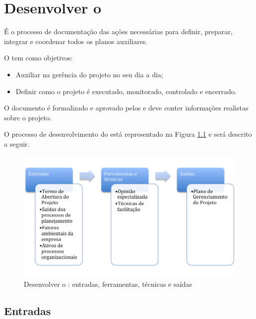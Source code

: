 \chapter{Desenvolver o \planproj}
\label{sec:planproj}

É o processo de documentação das ações necessárias para definir, preparar, integrar e coordenar todos os planos auxiliares.

O \planproj tem como objetivos:

\begin{itemize}
	
	\item Auxiliar na gerência do projeto no seu dia a dia;
	
	\item Definir como o projeto é executado, monitorado, controlado e encerrado.
	
\end{itemize}

O documento é formalizado e aprovado pelos \stake e deve conter informações realistas sobre o projeto.

O processo de desenvolvimento do \planproj está representado na Figura \ref{fig:plano:ger:projeto:etfs} e será descrito a seguir.

\begin{figure}[!h]
	\centering
	\includegraphics[scale=0.75]{Figuras/plano_ger_projeto_etfs.png}
	\caption{Desenvolver o \planproj: entradas, ferramentas, técnicas e saídas}
	\label{fig:plano:ger:projeto:etfs}
\end{figure}

\section{Entradas}

